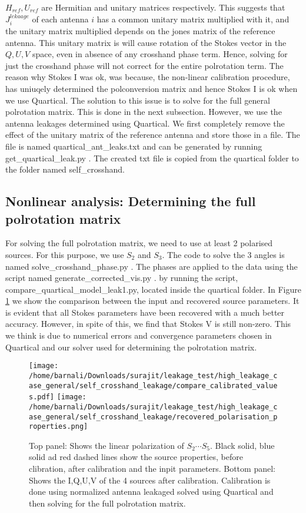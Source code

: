 \documentclass{article}
\begin{document}
$H_{ref},U_{ref}$ are Hermitian and unitary matrices respectively. This suggests that $J^{lekaage}_i$ of each antenna $i$ has a common unitary matrix multiplied with it, and the unitary matrix multiplied depends on the jones matrix of the reference antenna. This unitary matrix is will cause rotation of the Stokes vector in the $Q,U, V$  space, even in absence of any crosshand phase term. Hence, solving for just the crosshand phase will not correct for the entire polrotation term. The reason why Stokes I was ok, was because, the non-linear calibration procedure, has uniuqely determined the polconversion matrix and hence Stokes I is ok when we use Quartical. The solution to this issue is to solve for the full general polrotation matrix. This is done in the next subsection. However, we use the antenna leakages determined using Quartical. We first completely remove the effect of the unitary matrix of the reference antenna and store those in a file. The file is named quartical\_ant\_leaks.txt and can be generated by running get\_quartical\_leak.py . The created txt file is copied from the quartical folder to the folder named self\_crosshand.


\subsection{Nonlinear analysis: Determining the full polrotation matrix} \label{sec:full_porot}

For solving the full polrotation matrix, we need to use at least 2 polarised sources. For this purpose, we use $S_2$ and $S_3$. The code to solve the 3 angles is named solve\_crosshand\_phase.py . The phases are applied to the data using the script named generate\_corrected\_vis.py .  by running the script, compare\_quartical\_model\_leak1.py, located inside the quartical folder. In Figure \ref{fig:compare_input_output_source_params_self_crosshand_high_leak_general} we show the comparison between the input and recovered source parameters. It is evident that all Stokes parameters have been recovered with a much better accuracy. However, in spite of this, we find that Stokes V is still non-zero. This we think is due to numerical errors and convergence parameters chosen in Quartical and our solver used for determining the polrotation matrix.

\begin{figure}
\centering
\texttt{[image: /home/barnali/Downloads/surajit/leakage\_test/high\_leakage\_case\_general/self\_crosshand\_leakage/compare\_calibrated\_values.pdf]}
\texttt{[image: /home/barnali/Downloads/surajit/leakage\_test/high\_leakage\_case\_general/self\_crosshand\_leakage/recovered\_polarisation\_properties.png]}
\caption{Top panel: Shows the linear polarization of $S_2\cdots S_5$. Black solid, blue solid ad red dashed lines show the source properties, before clibration, after calibration and the inpit parameters. Bottom panel: Shows the I,Q,U,V of the 4 sources after calibration. Calibration is done using normalized antenna leakaged solved using Quartical and then solving for the full polrotation matrix.}
\label{fig:compare_input_output_source_params_self_crosshand_high_leak_general}
\end{figure}
\end{document}
